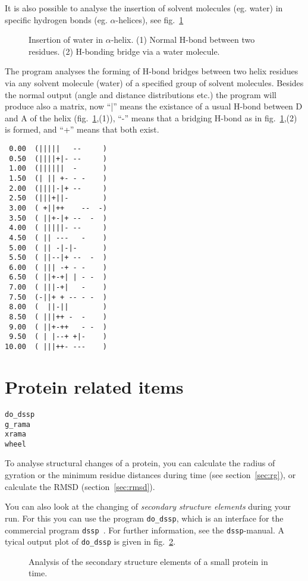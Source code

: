 It is also possible to analyse the insertion of solvent molecules (eg. water) 
in specific hydrogen bonds (eg. $\alpha$-helices), see fig.~\ref{fig:insert}
\begin{figure}[hbtp]
\centerline{
{}}
\caption[Insertion of water in $\alpha$-helix.]{Insertion of water in $\alpha$-helix. (1) Normal H-bond between two residues. (2) H-bonding bridge via a water molecule.}
\label{fig:insert}
\end{figure}
The program analyses the forming of H-bond bridges between two helix residues 
via any solvent molecule (water) of a specified group of solvent molecules. 
Besides the normal output (angle and distance distributions etc.) the program 
will produce also a matrix, now ``|'' means the existance of a usual H-bond 
between D and A of the helix (fig.~\ref{fig:insert},(1)), ``-'' means that a bridging H-bond as 
in fig.~\ref{fig:insert},(2) is formed, and ``+'' means that both exist.
{\small 
\begin{verbatim}
 0.00  (|||||   --     )
 0.50  (||||+|- --     )
 1.00  (||||||  -      )
 1.50  (| || +- - -    )
 2.00  (||||-|+ --     )
 2.50  (|||+||-        )
 3.00  ( +||++    --  -)
 3.50  ( ||+-|+ --  -  )
 4.00  ( |||||- --     )
 4.50  ( || ---   -    )
 5.00  ( || -|-|-      )
 5.50  ( ||--|+ --  -  )
 6.00  ( ||| -+ - -    )
 6.50  ( ||+-+| | - -  )
 7.00  ( |||-+|   -    )
 7.50  (-||+ + -- - -  )
 8.00  (  ||-||        )
 8.50  ( |||++ -  -    )
 9.00  ( ||+-++   - -  )
 9.50  ( | |--+ +|-    )
10.00  ( |||++- ---    )
\end{verbatim} } 
%
%
%
\section{Protein related items}
\begin{verbatim}
do_dssp
g_rama
xrama
wheel
\end{verbatim}
To analyse structural changes of a protein, you can calculate the radius of 
gyration or the minimum residue distances during time 
(see section~\ref{sec:rg}), or calculate the RMSD (section~\ref{sec:rmsd}).

You can also look at the changing of {\em secondary structure elements} 
during your run. For this you can use the program {\tt do\_dssp}, which is 
an interface for the commercial program {\tt dssp}~\cite{Kabsch83}. For 
further information, see the {\tt dssp}-manual. A tyical output plot of 
{\tt do\_dssp} is given in fig.~\ref{fig:dssp}.
%
\begin{figure}[hbtp]
\centerline{
}
\caption{Analysis of the secondary structure elements of a small protein in time.}
\label{fig:dssp}
\end{figure}
%

